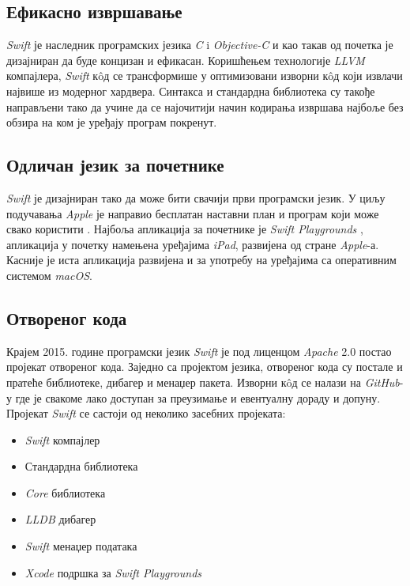 \documentclass[12pt,oneside]{memoir}
\begin{document}
\subsection{Ефикасно извршавање}

\indent \textit{Swift} је наследник програмских језика \textit{C} i \textit{Objective-C} и као такав од почетка је дизајниран да буде концизан и ефикасан. Коришћењем технологије \textit{LLVM} компајлера, \textit{Swift} к\^{o}д се трансформише у оптимизовани изворни к\^{o}д који извлачи највише из модерног хардвера. Синтакса и стандардна библиотека су такође направљени тако да учине да се најочитији начин кодирања извршава најбоље без обзира на ком је уређају програм покренут.

\subsection{Одличан језик за почетнике}

\textit{Swift} је дизајниран тако да може бити свачији први програмски језик. У циљу подучавања \textit{Apple} је направио бесплатан наставни план и програм који може свако користити \cite{Swift_Education}. Најбоља апликација за почетнике је \textit{Swift Playgrounds} \cite{Swift_Playground}, апликација у почетку намењена уређајима \textit{iPad}, развијена од стране \textit{Apple}-а. Касније је иста апликација развијена и за употребу на уређајима са оперативним системом \textit{macOS}. 

\subsection{Отвореног кода}
\indent Крајем 2015. године програмски језик \textit{Swift} је под лиценцом \textit{Apache} 2.0 постао пројекат отвореног кода. Заједно са пројектом језика, отвореног кода су постале и пратеће библиотеке, дибагер и менаџер пакета. Изворни к\^{o}д се налази на \textit{GitHub}-у где је свакоме лако доступан за преузимање и евентуалну дораду и допуну. Пројекат \textit{Swift} се састоји од неколико засебних пројеката: 
\begin{itemize}
    \item \textit{Swift} компајлер
    \item Стандардна библиотека
    \item \textit{Core} библиотека
    \item \textit{LLDB} дибагер
    \item \textit{Swift} менаџер података
    \item \textit{Xcode} подршка за \textit{Swift Playgrounds}
\end{itemize}
\end{document}
